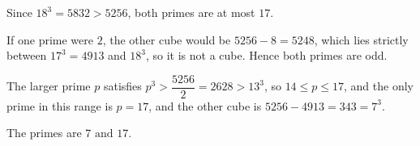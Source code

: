 Since \(18^3=5832>5256\), both primes are at most \(17\).

If one prime were \(2\), the other cube would be \(5256-8=5248\), which lies strictly between \(17^3=4913\) and \(18^3\), so it is not a cube. Hence both primes are odd.

The larger prime \(p\) satisfies \(p^3>\dfrac{5256}{2}=2628>13^3\), so \(14\le p\le17\), and the only prime in this range is \(p=17\), and the other cube is \(5256-4913=343=7^3\).

The primes are \(\boxed{7\text{ and }17}\).
